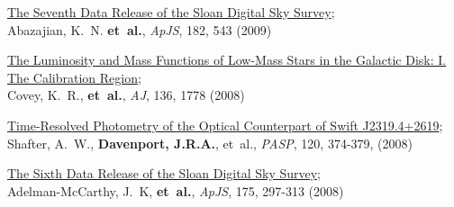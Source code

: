 \begin{etaremune}[leftmargin=10pt]
\item {\sc \href{http://adsabs.harvard.edu/abs/2009ApJS..182..543A}{\color{NavyBlue}The Seventh Data Release of the Sloan Digital Sky Survey}};\\
Abazajian, K.~N. {\bf et~al.}, {\em ApJS}, 182, 543 (2009)

\item {\sc \href{http://adsabs.harvard.edu/abs/2008AJ....136.1778C}{\color{NavyBlue}The Luminosity and Mass Functions of Low-Mass Stars in the Galactic Disk: I. The Calibration Region}};\\
Covey, K.~R., {\bf et~al.}, {\em AJ}, 136, 1778 (2008)

\item {\sc \href{http://adsabs.harvard.edu/abs/2008PASP..120..374S}{\color{NavyBlue}Time-Resolved Photometry of the Optical Counterpart of Swift J2319.4+2619}};\\
Shafter, A.~W., {\bf Davenport, J.R.A.}, et~al., {\em PASP}, 120, 374-379, (2008)

\item {\sc \href{http://adsabs.harvard.edu/abs/2008ApJS..175..297A}{\color{NavyBlue}The Sixth Data Release of the Sloan Digital Sky Survey}};\\
Adelman-McCarthy, J.~K, {\bf et~al.}, {\em ApJS}, 175, 297-313 (2008)
  
\end{etaremune}